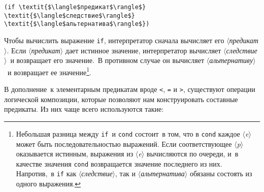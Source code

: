 \begin{Verbatim}[fontsize=\small]
(if \textit{$\langle$предикат$\rangle$} \textit{$\langle$следствие$\rangle$} \textit{$\langle$альтернатива$\rangle$})
\end{Verbatim}
Чтобы вычислить выражение {\tt if}, интерпретатор
сначала вычисляет его
\textit{$\langle$пре\-ди\-кат$\rangle$}. Если
\textit{$\langle$предикат$\rangle$} дает истинное значение,
интерпретатор вычисляет
\textit{$\langle$след\-ст\-вие$\rangle$}~и 
возвращает его значение.~В противном случае он вычисляет
\textit{$\langle$альтернативу$\rangle$}~и возвращает
ее значение\footnote{Небольшая разница между
{\tt if}~и {\tt cond} состоит~в том, что в
{\tt cond} каждое \textit{$\langle$e$\rangle$} может
быть последовательностью выражений.  Если соответствующее
\textit{$\langle$p$\rangle$} оказывается истинным, выражения из
\textit{$\langle$e$\rangle$} вычисляются по очереди, и~в качестве
значения {\tt cond} возвращается значение последнего из 
них.  Напротив,~в {\tt if} как
\textit{$\langle$следствие$\rangle$}, так и
\textit{$\langle$альтернатива$\rangle$} обязаны состоять из одного
выражения.}.

В дополнение~к элементарным предикатам вроде
{\tt <}, {\tt =} и
{\tt >}, существуют операции логической композиции,
которые позволяют нам конструировать составные предикаты. Из них чаще
всего используются такие:

